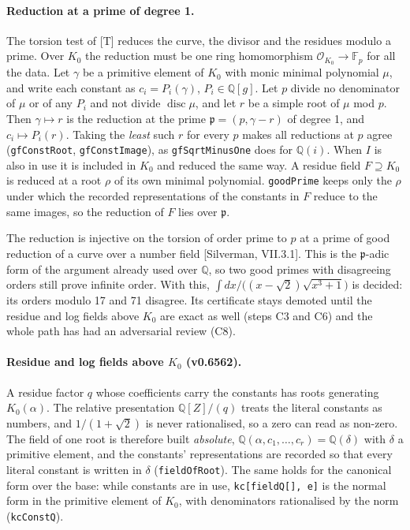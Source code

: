 \documentclass[11pt]{article}
\theoremstyle{definition}
\theoremstyle{remark}
\newcommand{\Q}{\mathbb{Q}}
\newcommand{\code}[1]{\texttt{#1}}
\begin{document}
\paragraph{Reduction at a prime of degree 1.} The torsion test of [T] reduces
the curve, the divisor and the residues modulo a prime. Over $K_0$ the
reduction must be one ring homomorphism $\mathcal O_{K_0}\to\mathbb{F}_p$ for all the
data. Let $\gamma$ be a primitive element of $K_0$ with monic minimal
polynomial $\mu$, and write each constant as $c_i=P_i(\gamma)$, $P_i\in\Q[g]$.
Let $p$ divide no denominator of $\mu$ or of any $P_i$ and not divide
$\operatorname{disc}\mu$, and let $r$ be a simple root of $\mu$ mod $p$. Then
$\gamma\mapsto r$ is the reduction at the prime $\mathfrak p=(p,\gamma-r)$ of
degree 1, and $c_i\mapsto P_i(r)$. Taking the \emph{least} such $r$ for every
$p$ makes all reductions at $p$ agree (\code{gfConstRoot},
\code{gfConstImage}), as \code{gfSqrtMinusOne} does for $\Q(i)$. When $I$ is
also in use it is included in $K_0$ and reduced the same way. A residue field
$F\supseteq K_0$ is reduced at a root $\rho$ of its own minimal polynomial.
\code{goodPrime} keeps only the $\rho$ under which the recorded representations
of the constants in $F$ reduce to the same images, so the reduction of $F$ lies
over $\mathfrak p$.

The reduction is injective on the torsion of order prime to $p$ at a prime of
good reduction of a curve over a number field [Silverman, VII.3.1]. This is
the $\mathfrak p$-adic form of the argument already used over $\Q$, so two good
primes with disagreeing orders still prove infinite order. With this,
$\int dx/\bigl((x-\sqrt2)\sqrt{x^3+1}\bigr)$ is decided: its orders modulo 17
and 71 disagree. Its certificate stays demoted until the residue and log
fields above $K_0$ are exact as well (steps C3 and C6) and the whole path has
had an adversarial review (C8).


\paragraph{Residue and log fields above $K_0$ (v0.6562).} A residue factor $q$
whose coefficients carry the constants has roots generating
$K_0(\alpha)$. The relative presentation $\Q[Z]/(q)$ treats the literal
constants as numbers, and $1/(1+\sqrt2)$ is never rationalised, so a zero can
read as non-zero. The field of one root is therefore built \emph{absolute},
$\Q(\alpha,c_1,\dots,c_r)=\Q(\delta)$ with $\delta$ a primitive element, and
the constants' representations are recorded so that every literal constant is
written in $\delta$ (\code{fieldOfRoot}). The same holds for the canonical form
over the base: while constants are in use, \code{kc[fieldQ[], e]} is the normal
form in the primitive element of $K_0$, with denominators rationalised by the
norm (\code{kcConstQ}).
\end{document}

